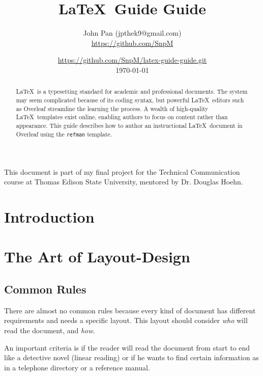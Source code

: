 \documentclass[twoside,a4paper]{refart}
\title{\LaTeX\ Guide Guide}
\author{
John Pan (jpthek9@gmail.com)\\
\url{https://github.com/SnpM}
}
\date{\url{https://github.com/SnpM/latex-guide-guide.git}\\\today}
\begin{document}
\maketitle

\begin{abstract}
         \LaTeX\ is a typesetting standard for academic and professional documents. The system may seem complicated because of its coding syntax, but powerful \LaTeX\ editors such as Overleaf streamline the learning the process. A wealth of high-quality \LaTeX\ templates exist online, enabling authors to focus on content rather than appearance. This guide describes how to author an instructional \LaTeX\ document in Overleaf using the \texttt{refman} template.
\end{abstract}

This document is part of my final project for the Technical Communication course at Thomas Edison State University, mentored by Dr. Douglas Hoehn. 

\tableofcontents

\newpage



\section{Introduction}



\section{The Art of Layout-Design}
\label{design}
\label{Layout-Design}

\subsection{Common Rules}

There are almost no common rules because every kind of document has 
different requirements and needs a specific layout. This layout 
should consider \emph{who} will read the document, and \emph{how}.

An important criteria is if the reader will read the document from 
start to end like a detective novel (linear reading) or if he wants to 
find certain information as in a telephone directory or a 
reference manual.  
\end{document}
